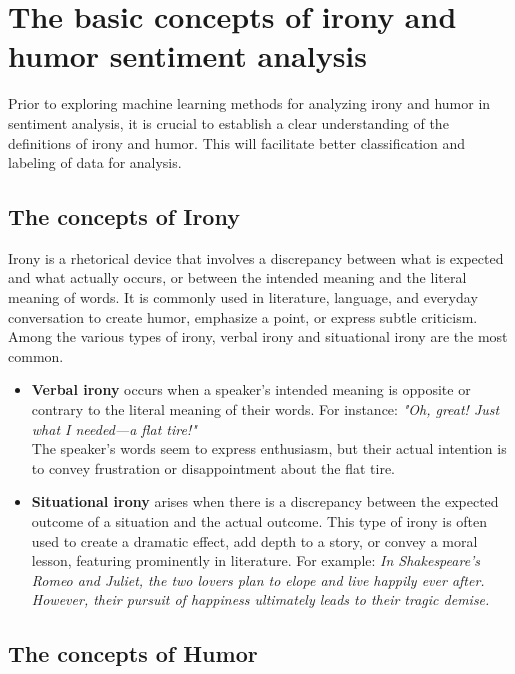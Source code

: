 \documentclass[a4paper]{article}
\begin{document}
\section{The basic concepts of irony and humor sentiment analysis}

Prior to exploring machine learning methods for analyzing irony and humor in sentiment analysis, it is crucial to establish a clear understanding of the definitions of irony and humor. This will facilitate better classification and labeling of data for analysis.

\subsection{The concepts of Irony}

Irony is a rhetorical device that involves a discrepancy between what is expected and what actually occurs, or between the intended meaning and the literal meaning of words. It is commonly used in literature, language, and everyday conversation to create humor, emphasize a point, or express subtle criticism. Among the various types of irony, verbal irony and situational irony are the most common.\cite{ref_concept1,ref_concept2}

\begin{itemize}
\item {\bf Verbal irony} occurs when a speaker's intended meaning is opposite or contrary to the literal meaning of their words. For instance: 
    \subitem \textit{"Oh, great! Just what I needed—a flat tire!"} 
    \\The speaker's words seem to express enthusiasm, but their actual intention is to convey frustration or disappointment about the flat tire.
\item {\bf Situational irony} arises when there is a discrepancy between the expected outcome of a situation and the actual outcome. This type of irony is often used to create a dramatic effect, add depth to a story, or convey a moral lesson, featuring prominently in literature. For example:
    \subitem \textit{In Shakespeare's Romeo and Juliet, the two lovers plan to elope and live happily ever after. However, their pursuit of happiness ultimately leads to their tragic demise.}
\end{itemize}

\subsection{The concepts of Humor}
\end{document}
